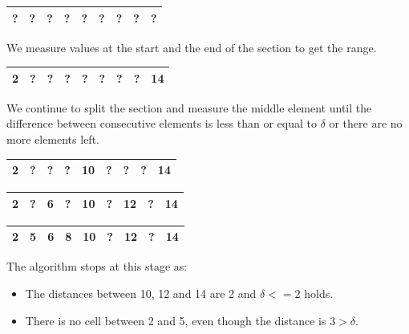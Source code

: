 \documentclass[dissertation.tex]{subfiles}
\begin{document}
  \begin{table}[H]
    \centering
      \begin{tabular}{|c|c|c|c|c|c|c|c|c|}
      \hline			
        ?&?&?&?&?&?&?&?&? \\
      \hline  
    \end{tabular}
  \end{table}

  We measure values at the start and the end of the section to get the range.

  \begin{table}[H]
    \centering
      \begin{tabular}{|c|c|c|c|c|c|c|c|c|}
      \hline			
        \bf{2}&?&?&?&?&?&?&?&\bf{14}\\
      \hline  
    \end{tabular}
  \end{table}

  We continue to split the section and measure the middle element until the
  difference between consecutive elements is less than or equal to $\delta$ or
  there are no more elements left.


  \begin{table}[H]
    \centering
      \begin{tabular}{|c|c|c|c|c|c|c|c|c|}
      \hline			
        2&?&?&?&\bf{10}&?&?&?&14\\
      \hline  
    \end{tabular}
  \end{table}

  \begin{table}[H]
    \centering
      \begin{tabular}{|c|c|c|c|c|c|c|c|c|}
      \hline			
        2&?&\bf{6}&?&10&?&\bf{12}&?&14\\
      \hline  
    \end{tabular}
  \end{table}

  \begin{table}[H]
    \centering
      \begin{tabular}{|c|c|c|c|c|c|c|c|c|}
      \hline			
        2&\bf{5}&6&\bf{8}&10&?&12&?&14\\
      \hline  
    \end{tabular}
  \end{table}

  The algorithm stops at this stage as:
  \begin{itemize}
    \item{
        The distances between 10, 12 and 14 are 2 and $\delta <= 2$ holds.
      }
    \item{
        There is no cell between 2 and 5, even though the distance is $3 >
        \delta$.
      }
  \end{itemize}
\end{document}
